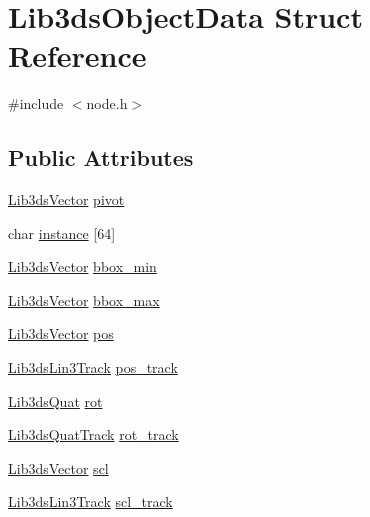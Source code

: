 \hypertarget{struct_lib3ds_object_data}{\section{Lib3ds\-Object\-Data Struct Reference}
\label{struct_lib3ds_object_data}
}


{\ttfamily \#include $<$node.\-h$>$}

\subsection*{Public Attributes}
\begin{DoxyCompactItemize}
\item 
\hyperlink{group__vector_ga6ac1c3b3ef15381ebf6baf264d658dcf}{Lib3ds\-Vector} \hyperlink{struct_lib3ds_object_data_a0bac804605a6b17445451b3dddb91e50}{pivot}
\item 
char \hyperlink{struct_lib3ds_object_data_ada197066312c4674728546881dcacf6d}{instance} \mbox{[}64\mbox{]}
\item 
\hyperlink{group__vector_ga6ac1c3b3ef15381ebf6baf264d658dcf}{Lib3ds\-Vector} \hyperlink{struct_lib3ds_object_data_a6d60fc5846deefb4ff36bca9b5fbf2a9}{bbox\-\_\-min}
\item 
\hyperlink{group__vector_ga6ac1c3b3ef15381ebf6baf264d658dcf}{Lib3ds\-Vector} \hyperlink{struct_lib3ds_object_data_a453c960ee983570948d990ee303524b4}{bbox\-\_\-max}
\item 
\hyperlink{group__vector_ga6ac1c3b3ef15381ebf6baf264d658dcf}{Lib3ds\-Vector} \hyperlink{struct_lib3ds_object_data_a4d9a104fd664608bbcb8c905317f95a9}{pos}
\item 
\hyperlink{struct_lib3ds_lin3_track}{Lib3ds\-Lin3\-Track} \hyperlink{struct_lib3ds_object_data_aaedbe62f5cceba04f9039dfac2812288}{pos\-\_\-track}
\item 
\hyperlink{group__quat_ga9969ef1e618ba698c4b8374f14b548be}{Lib3ds\-Quat} \hyperlink{struct_lib3ds_object_data_a8f34b3b5d731df00b474b3ce82056f50}{rot}
\item 
\hyperlink{struct_lib3ds_quat_track}{Lib3ds\-Quat\-Track} \hyperlink{struct_lib3ds_object_data_acd5fc5207358c26ea20e6b841afe3fbd}{rot\-\_\-track}
\item 
\hyperlink{group__vector_ga6ac1c3b3ef15381ebf6baf264d658dcf}{Lib3ds\-Vector} \hyperlink{struct_lib3ds_object_data_a1684bd1348d91ce3970d17da9fa7c36d}{scl}
\item 
\hyperlink{struct_lib3ds_lin3_track}{Lib3ds\-Lin3\-Track} \hyperlink{struct_lib3ds_object_data_a94c6fd9ad997abe5bc5dd98a84be1353}{scl\-\_\-track}

\end{DoxyCompactItemize}
